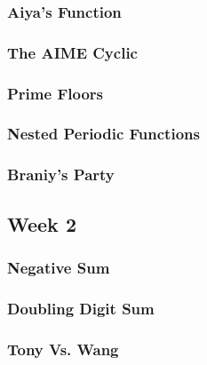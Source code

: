 \documentclass[titlepage=true]{scrartcl}
\begin{document}
        \subsubsection{Aiya's Function}
            \label{6.1.3}
            
        \newpage

        \subsubsection{The AIME Cyclic}
            \label{6.1.4}
            
        \newpage

        \subsubsection{Prime Floors}
            \label{6.1.5}
            
        \newpage

        \subsubsection{Nested Periodic Functions}
            \label{6.1.6}
            

        \subsubsection{Braniy's Party}
            \label{6.1.7}
            
        \newpage

    \subsection{Week 2}

        \subsubsection{Negative Sum}
            \label{6.2.1}
            
        \newpage

        \subsubsection{Doubling Digit Sum}
            \label{6.2.2}
            
        \newpage

        \subsubsection{Tony Vs. Wang}
            \label{6.2.3}
            
        \newpage 
        
\end{document}
